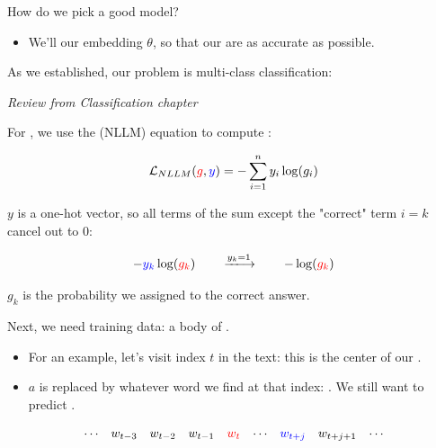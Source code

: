         How do we pick a good model? 

        \begin{itemize}
            \item We'll  our embedding $\theta$, so that our  are as accurate as possible.
        \end{itemize}

        As we established, our problem is multi-class classification:\\

        \begin{concept}
            \textit{Review from Classification chapter}

            For , we use the  (NLLM) equation to compute :

            \begin{equation*}
                \mathcal{L}_{NLLM}
                (\textcolor{red}{g} , \textcolor{blue}{y})
                =
                -\sum_{i=1}^n
                y_i \log(g_i)
            \end{equation*}

            $y$ is a one-hot vector, so all terms of the sum except the "correct" term $i=k$ cancel out to 0:

            \begin{equation*}
                -\blu{y_k} \log(\red{g_k})
                \qquad \xlongrightarrow{y_k=1  } \qquad
                -\log(\red{g_k})
            \end{equation*}
        \end{concept}

        $g_k$ is the probability we assigned to the correct answer.

        Next, we need training data: a body of .

        \begin{itemize}
            \item For an example, let's visit index $t$ in the text: this is the center of our . 
            \item $a$ is replaced by whatever word we find at that index: . We still want to predict .
        \end{itemize}

        \begin{equation}
            \begin{matrix}
                \cdots & w_{t-3} & 
                \begin{matrix}
                    w_{t-2} & w_{t-1} & \textcolor{red}{w_t} 
                \end{matrix} 
                & \cdots & \textcolor{blue}{w_{t+j}}
                & w_{t+j+1} & \cdots
            \end{matrix}
        \end{equation}

